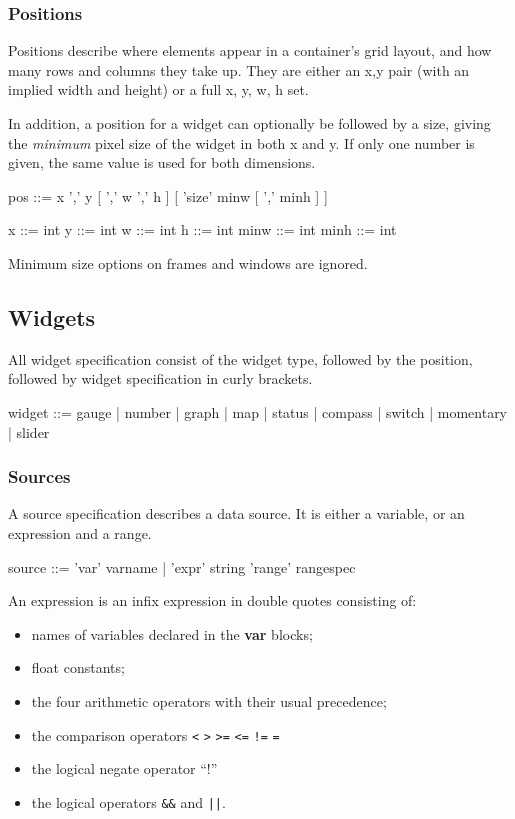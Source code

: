 \subsubsection{Positions}
Positions describe where elements appear in a container's
grid layout, and how many rows and columns they take up. They
are either an x,y pair (with an implied width and height) or a full
x, y, w, h set.

In addition, a position for a widget
can optionally be followed by a size, giving the \emph{minimum} pixel size of
the widget in both x and y. If only one number is given, the same value is
used for both dimensions.
\begin{v}
pos         ::=  x ',' y [ ',' w ',' h ] [ 'size' minw [ ',' minh ] ]

x           ::= int
y           ::= int
w           ::= int
h           ::= int
minw        ::= int
minh        ::= int
\end{v}
Minimum size options on frames and windows are ignored.

\subsection{Widgets}
All widget specification consist of the widget type, followed by the position,
followed by widget specification in curly brackets.

\begin{v}
widget      ::= gauge | number | graph | map | status |
                compass | switch | momentary | slider
\end{v}

\subsubsection{Sources}
A source specification describes a data source. It is either a
variable, or an expression and a range.
\begin{v}
source      ::= 'var' varname
            |   'expr' string 'range' rangespec
\end{v}
An expression is an infix expression in double quotes consisting of:
\begin{itemize}
\item names of variables declared in the \textbf{var} blocks;
\item float constants;
\item the four arithmetic operators with their usual precedence;
\item the comparison operators \verb+<+ \verb+>+ \verb+>=+ \verb+<=+ 
\verb+!=+ \verb+=+
\item the logical negate operator ``!''
\item the logical operators \verb+&&+ and \verb+||+.
\end{itemize}

